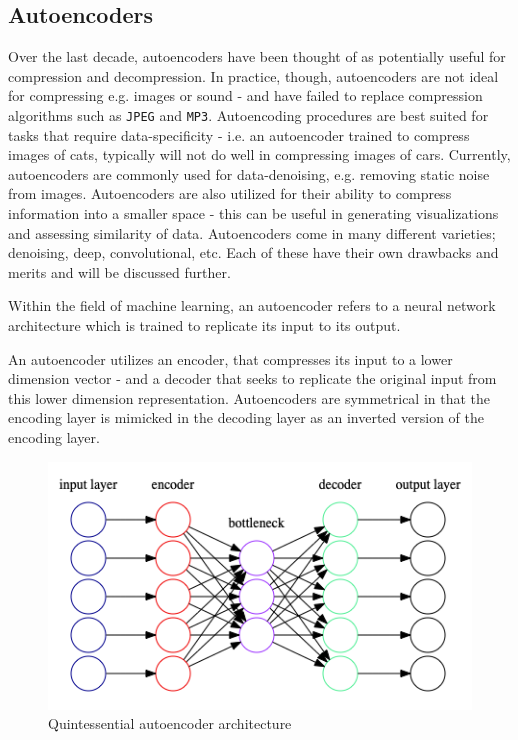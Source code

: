 \subsection{Autoencoders} \label{sec:Autoencoders}
Over the last decade, autoencoders have been thought of as potentially useful for compression and decompression. 
In practice, though, autoencoders are not ideal for compressing e.g. images or sound - and have failed to replace compression algorithms such as \texttt{JPEG} and \texttt{MP3}.
Autoencoding procedures are best suited for tasks that require data-specificity - i.e. an autoencoder trained to compress images of cats, typically will not do well in compressing images of cars. 
\newline
Currently, autoencoders are commonly used for data-denoising, e.g. removing static noise from images. 
Autoencoders are also utilized for their ability to compress information into a smaller space - this can be useful in generating visualizations and assessing similarity of data. 
\newline
Autoencoders come in many different varieties; denoising, deep, convolutional, etc. Each of these have their own drawbacks and merits and will be discussed further.

Within the field of machine learning, an autoencoder refers to a neural network architecture which is trained to replicate its input to its output\autocite{Bengio2009}.

An autoencoder utilizes an encoder, that compresses its input to a lower dimension vector - and a decoder that seeks to replicate the original input from this lower dimension representation.
Autoencoders are symmetrical in that the encoding layer is mimicked in the decoding layer as an inverted version of the encoding layer.

\begin{figure}[H]
    \centering
    \includegraphics[scale=0.4]{pictures/graphviz/autoencoder_simple}
    \caption{Quintessential autoencoder architecture}
    \label{fig:simpleautoencoder}
\end{figure}

